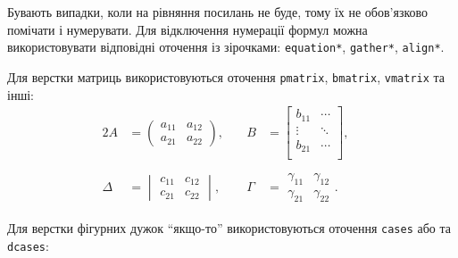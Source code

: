 \documentclass[]{iptconf}
\begin{document}


Бувають випадки, коли на рівняння посилань не буде, тому їх не обов'язково помічати і нумерувати. Для відключення нумерації формул можна використовувати відповідні оточення із зірочками: \texttt{equation*}, \texttt{gather*}, \texttt{align*}.

Для верстки матриць використовуються оточення \texttt{pmatrix}, \texttt{bmatrix},
\texttt{vmatrix} та інші:
\begin{alignat*}{2}
	A      & = \begin{pmatrix}
		           a_{11} & a_{12} \\
		           a_{21} & a_{22}
	           \end{pmatrix},\quad
	       &
	B      & = \begin{bmatrix}
		           b_{11} & \cdots \\
		           \vdots & \ddots \\
		           b_{21} & \cdots \\
	           \end{bmatrix},\quad       \\
	       &                             \\
	\Delta & = \begin{vmatrix}
		           c_{11} & c_{12} \\
		           c_{21} & c_{22}
	           \end{vmatrix}, \quad
	       &
	\Gamma & = \begin{matrix}
		           \gamma_{11} & \gamma_{12} \\
		           \gamma_{21} & \gamma_{22}
	           \end{matrix} .
\end{alignat*}

Для верстки фігурних дужок ``якщо-то'' використовуються оточення \texttt{cases} або
та \texttt{dcases}:
\end{document}
